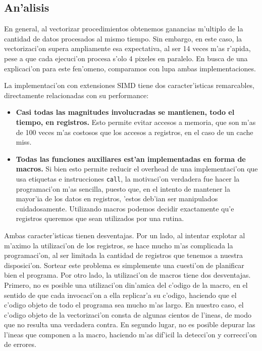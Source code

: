 \subsection{An'alisis}

En general, al vectorizar procedimientos obtenemos ganancias m'ultiplo de la cantidad de datos procesados al mismo tiempo. Sin embargo, en este caso, la vectorizaci'on supera ampliamente esa expectativa, al ser 14 veces m'as r'apida, pese a que cada ejecuci'on procesa s'olo 4 pixeles en paralelo. En busca de una explicaci'on para este fen'omeno, comparamos con lupa ambas implementaciones.

La implementaci'on con extensiones SIMD tiene dos caracter'isticas remarcables, directamente relacionadas con su performance:

\begin{itemize}
	\item \textbf{Casi todas las magnitudes involucradas se mantienen, todo el tiempo, en registros.} Esto permite evitar accesos a memoria, que son m'as de 100 veces m'as costosos que los accesos a registros, en el caso de un cache miss.
	\item \textbf{Todas las funciones auxiliares est'an implementadas en forma de macros.} Si bien esto permite reducir el overhead de una implementaci'on que usa etiquetas e instrucciones \texttt{call}, la motivaci'on verdadera fue hacer la programaci'on m'as sencilla, puesto que, en el intento de mantener la mayor'ia de los datos en registros, 'estos deb'ian ser manipulados cuidadosamente. Utilizando macros podemos decidir exactamente qu'e registros queremos que sean utilizados por una rutina.
\end{itemize}

Ambas caracter'isticas tienen desventajas. Por un lado, al intentar explotar al m'aximo la utilizaci'on de los registros, se hace mucho m'as complicada la programaci'on, al ser limitada la cantidad de registros que tenemos a nuestra disposici'on. Sortear este problema es simplemente una cuesti'on de planificar bien el programa. Por otro lado, la utilizaci'on de macros tiene dos desventajas. Primero, no es posible una utilizaci'on din'amica del c'odigo de la macro, en el sentido de que cada invocaci'on a ella replicar'a su c'odigo, haciendo que el c'odigo objeto de todo el programa sea mucho m'as largo. En nuestro caso, el c'odigo objeto de la vectorizaci'on consta de algunas cientos de l'ineas, de modo que no resulta una verdadera contra. En segundo lugar, no es posible depurar las l'ineas que componen a la macro, haciendo m'as dif'icil la detecci'on y correcci'on de errores.

